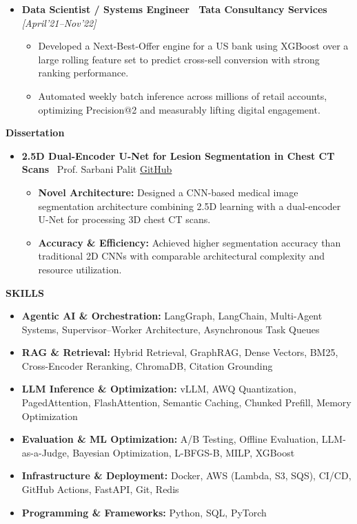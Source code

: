 \documentclass[10pt,article]{article}
\newcommand{\resheading}[1]{%
 \vspace{7pt}%
 \noindent\colorbox{mygrey}{\parbox{\dimexpr\textwidth-2\fboxsep\relax}{\textbf{\small #1}}}%
 \vspace{4pt}%
}
\begin{document}
\begin{itemize}
\begin{itemize}
       \item Designed a tensor IR (SSA DAG) with shape inference and dependency tracking for kernel fusion and code generation.
   \end{itemize}
   \item \textbf{Data Scientist / Systems Engineer \textbar\ Tata Consultancy Services} \hfill \textit{[April'21--Nov'22]}
   \begin{itemize}
       \item Developed a Next-Best-Offer engine for a US bank using XGBoost over a large rolling feature set to predict cross-sell conversion with strong ranking performance.
       \item Automated weekly batch inference across millions of retail accounts, optimizing Precision@2 and measurably lifting digital engagement.
   \end{itemize}
\end{itemize}

\resheading{Dissertation}
\begin{itemize}
   \item \textbf{2.5D Dual-Encoder U-Net for Lesion Segmentation in Chest CT Scans} \textbar\ Prof. Sarbani Palit \hfill \href{YOUR_GITHUB_LINK}{GitHub}
   \begin{itemize}
       \item \textbf{Novel Architecture:} Designed a CNN-based medical image segmentation architecture combining 2.5D learning with a dual-encoder U-Net for processing 3D chest CT scans.
       \item \textbf{Accuracy \& Efficiency:} Achieved higher segmentation accuracy than traditional 2D CNNs with comparable architectural complexity and resource utilization.
   \end{itemize}
\end{itemize}

\resheading{SKILLS}
\begin{itemize}[itemsep=3.5pt]
\item \textbf{Agentic AI \& Orchestration:} LangGraph, LangChain, Multi-Agent Systems, Supervisor--Worker Architecture, Asynchronous Task Queues
\item \textbf{RAG \& Retrieval:} Hybrid Retrieval, GraphRAG, Dense Vectors, BM25, Cross-Encoder Reranking, ChromaDB, Citation Grounding
\item \textbf{LLM Inference \& Optimization:} vLLM, AWQ Quantization, PagedAttention, FlashAttention, Semantic Caching, Chunked Prefill, Memory Optimization
\item \textbf{Evaluation \& ML Optimization:} A/B Testing, Offline Evaluation, LLM-as-a-Judge, Bayesian Optimization, L-BFGS-B, MILP, XGBoost
\item \textbf{Infrastructure \& Deployment:} Docker, AWS (Lambda, S3, SQS), CI/CD, GitHub Actions, FastAPI, Git, Redis
\item \textbf{Programming \& Frameworks:} Python, SQL, PyTorch
\end{itemize}
\end{document}
